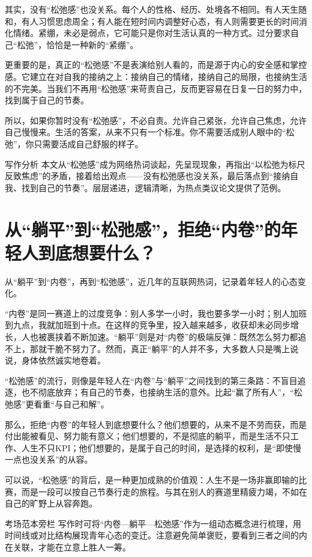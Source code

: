 其实，没有“松弛感”也没关系。每个人的性格、经历、处境各不相同。有人天生随和，有人习惯思虑周全；有人能在短时间内调整好心态，有人则需要更长的时间消化情绪。紧绷，未必是弱点，它可能只是你对生活认真的一种方式。过分要求自己“松弛”，恰恰是一种新的“紧绷”。

更重要的是，真正的“松弛感”不是表演给别人看的，而是源于内心的安全感和掌控感。它建立在对自我的接纳之上：接纳自己的情绪，接纳自己的局限，也接纳生活的不完美。当我们不再用“松弛感”来苛责自己，反而更容易在日复一日的努力中，找到属于自己的节奏。

所以，如果你暂时没有“松弛感”，不必自责。允许自己紧张，允许自己焦虑，允许自己慢慢来。生活的答案，从来不只有一个标准。你不需要活成别人眼中的“松弛”，你只需要活成自己舒服的样子。

\begin{quoteBox}{写作分析}
本文从“松弛感”成为网络热词谈起，先呈现现象，再指出“以松弛为标尺反致焦虑”的矛盾，接着给出观点——没有松弛感也没关系，最后落点到“接纳自我、找到自己的节奏”。层层递进，逻辑清晰，为热点类议论文提供了范例。
\end{quoteBox}

\clearpage
\section*{从“躺平”到“松弛感”，拒绝“内卷”的年轻人到底想要什么？}

从“躺平”到“内卷”，再到“松弛感”，近几年的互联网热词，记录着年轻人的心态变化。

“内卷”是同一赛道上的过度竞争：别人多学一小时，我也要多学一小时；别人加班到九点，我就加班到十点。在这样的竞争里，投入越来越多，收获却未必同步增长，人也被裹挟着不断加速。“躺平”则是对“内卷”的极端反弹：既然怎么努力都追不上，那就干脆不努力了。然而，真正“躺平”的人并不多，大多数人只是嘴上说说，身体依然诚实地卷着。

“松弛感”的流行，则像是年轻人在“内卷”与“躺平”之间找到的第三条路：不盲目追逐，也不彻底放弃；有自己的节奏，也接纳生活的意外。比起“赢了所有人”，“松弛感”更看重“与自己和解”。

那么，拒绝“内卷”的年轻人到底想要什么？他们想要的，从来不是不劳而获，而是付出能被看见、努力能有意义；他们想要的，不是彻底的躺平，而是生活不只工作、人生不只KPI；他们想要的，是属于自己的时间，是选择的权利，是“即使慢一点也没关系”的从容。

可以说，“松弛感”的背后，是一种更加成熟的价值观：人生不是一场非赢即输的比赛，而是一段可以按自己节奏行走的旅程。与其在别人的赛道里精疲力竭，不如在自己的旷野上从容奔跑。

\begin{quoteBox}{考场范本旁栏}
写作时可将“内卷—躺平—松弛感”作为一组动态概念进行梳理，用时间线或对比结构展现青年心态的变迁。注意避免简单褒贬，要看到三者之间的内在关联，才能在立意上胜人一筹。
\end{quoteBox}

